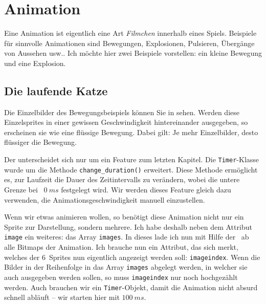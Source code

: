 \newpage
\section{Animation}
Eine Animation ist eigentlich eine Art \emph{Filmchen} innerhalb eines Spiels. Beispiele für sinnvolle Animationen sind Bewegungen, Explosionen, Pulsieren, Übergänge von Aussehen usw.. Ich möchte hier zwei Beispiele vorstellen: ein kleine Bewegung und eine Explosion.

\subsection{Die laufende Katze}


Die Einzelbilder des Bewegungsbeispiels können Sie in  sehen. Werden diese Einzelsprites in einer gewissen Geschwindigkeit hintereinander ausgegeben, so erscheinen sie wie eine flüssige Bewegung. Dabei gilt: Je mehr Einzelbilder, desto flüssiger die Bewegung.

Der  unterscheidet sich nur um ein Feature zum letzten Kapitel. Die \texttt{Timer}-Klasse wurde um die Methode \texttt{change\_duration()} erweitert. Diese Methode ermöglicht es, zur Laufzeit die Dauer des Zeitintervalls zu verändern, wobei die untere Grenze bei ~$0~ms$ festgelegt wird. Wir werden dieses Feature gleich dazu verwenden, die Animationsgeschwindigkeit manuell einzustellen. 


Wenn wir etwas animieren wollen, so benötigt diese Animation nicht nur ein Sprite zur Darstellung, sondern mehrere. Ich habe deshalb neben dem Attribut \texttt{image} ein weiteres: das Array \texttt{images}. In dieses lade ich nun mit Hilfe der \forSchleife\ ab  alle Bitmaps der Animation. Ich brauche nun ein Attribut, das sich merkt, welches der 6~Sprites nun eigentlich angezeigt werden soll: \texttt{imageindex}. Wenn die Bilder in der Reihenfolge in das Array \texttt{images} abgelegt werden, in welcher sie auch ausgegeben werden sollen, so muss \texttt{imageindex} nur noch hochgezählt werden. Auch brauchen wir ein \texttt{Timer}-Objekt, damit die Animation nicht absurd schnell abläuft -- wir starten hier mit $100~ms$.


